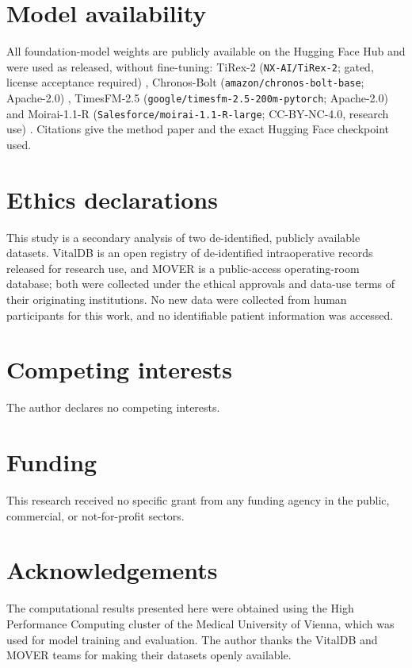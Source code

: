 \documentclass[11pt]{article}
\begin{document}
\section*{Model availability}
All foundation-model weights are publicly available on the Hugging Face Hub
and were used as released, without fine-tuning: TiRex-2 (\texttt{NX-AI/\allowbreak TiRex-2};
gated, license acceptance required) \citep{Podest2026,Auer2025,HFTiRex2},
Chronos-Bolt (\texttt{amazon/\allowbreak chronos-bolt-base}; Apache-2.0)
\citep{Ansari2024,HFChronosBolt}, TimesFM-2.5
(\texttt{google/\allowbreak timesfm-2.5-\allowbreak 200m-pytorch}; Apache-2.0)
\citep{Das2024,HFTimesFM} and Moirai-1.1-R
(\texttt{Salesforce/\allowbreak moirai-1.1-R-large}; CC-BY-NC-4.0, research use)
\citep{Woo2024,HFMoirai}. Citations give the method paper and the exact
Hugging Face checkpoint used.

\section*{Ethics declarations}
This study is a secondary analysis of two de-identified, publicly available
datasets. VitalDB is an open registry of de-identified intraoperative
records released for research use, and MOVER is a public-access
operating-room database; both were collected under the ethical approvals and
data-use terms of their originating institutions. No new data were collected
from human participants for this work, and no identifiable patient
information was accessed.

\section*{Competing interests}
The author declares no competing interests.

\section*{Funding}
This research received no specific grant from any funding agency in the
public, commercial, or not-for-profit sectors.

\section*{Acknowledgements}
The computational results presented here were obtained using the High
Performance Computing cluster of the Medical University of Vienna, which was
used for model training and evaluation. The author thanks the VitalDB and
MOVER teams for making their datasets openly available.
\end{document}
